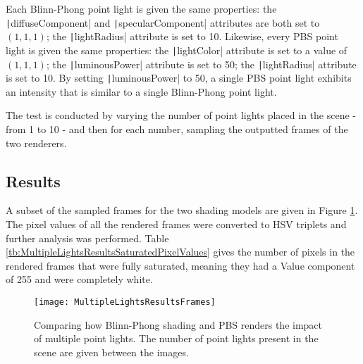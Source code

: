 Each Blinn-Phong point light is given the same properties: the \texttt|diffuseComponent| and \texttt|specularComponent| attributes are both set to \begin{math}(1, 1, 1)\end{math}; the \texttt|lightRadius| attribute is set to 10. Likewise, every PBS point light is given the same properties: the \texttt|lightColor| attribute is set to a value of \begin{math}(1, 1, 1)\end{math}; the \texttt|luminousPower| attribute is set to 50; the \texttt|lightRadius| attribute is set to 10. By setting \texttt|luminousPower| to 50, a single PBS point light exhibits an intensity that is similar to a single Blinn-Phong point light.

The test is conducted by varying the number of point lights placed in the scene - from 1 to 10 - and then for each number, sampling the outputted frames of the two renderers.

\subsection{Results}

A subset of the sampled frames for the two shading models are given in Figure \ref{fig:MultipleLightsResultsFrames}. The pixel values of all the rendered frames were converted to HSV triplets and further analysis was performed. Table \ref{tb:MultipleLightsResultsSaturatedPixelValues} gives the number of pixels in the rendered frames that were fully saturated, meaning they had a Value component of 255 and were completely white.

\begin{figure}[h]
	\centering
	\texttt{[image: MultipleLightsResultsFrames]}
	\caption{Comparing how Blinn-Phong shading and PBS renders the impact of multiple point lights. The number of point lights present in the scene are given between the images.}
	\label{fig:MultipleLightsResultsFrames}
\end{figure}

